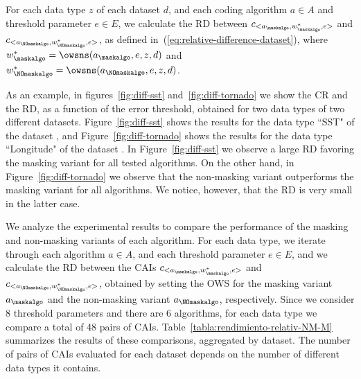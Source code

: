 For each data type $z$ of each dataset $d$, and each coding algorithm $a \in A$ and threshold parameter $e \in E$, we calculate the RD between $c_{<a_\maskalgo, w_\maskalgo^{*}, e>}$ and $c_{<a_\NOmaskalgo, w_\NOmaskalgo^{*}, e>}$, as defined in~(\ref{eq:relative-difference-dataset}), where $w_\maskalgo^{*}=\owsns(a_\maskalgo, e, z, d)$ and $w_\NOmaskalgo^{*}=\owsns(a_\NOmaskalgo, e, z, d)$.


\vspace{+2pt}
As an example, in figures~\ref{fig:diff-sst} and~\ref{fig:diff-tornado} we show the CR and the RD, as a function of the error threshold, obtained for two data types of two different datasets. Figure~\ref{fig:diff-sst} shows the results for the data type ``SST" of the dataset \datasetsst, and Figure~\ref{fig:diff-tornado} shows the results for the data type ``Longitude" of the dataset \datasettornado. In Figure~\ref{fig:diff-sst} we observe a large RD favoring the masking variant for all tested algorithms. On the other hand, in Figure~\ref{fig:diff-tornado} we observe that the non-masking variant outperforms the masking variant for all algorithms. We notice, however, that the RD is very small in the latter case.


\clearpage



\clearpage


We analyze the experimental results to compare the performance of the masking and non-masking variants of each algorithm. For each data type, we iterate through each algorithm $a \in A$, and each threshold parameter $e \in E$, and we calculate the RD between the CAIs $c_{<a_\maskalgo, w_\maskalgo^{*}, e>}$ and $c_{<a_\NOmaskalgo, w_\NOmaskalgo^{*}, e>}$, obtained by setting the OWS for the masking variant $a_\maskalgo$ and the non-masking variant $a_\NOmaskalgo$, respectively. Since we consider 8 threshold parameters and there are 6 algorithms, for each data type we compare a total of 48 pairs of CAIs. Table~\ref{tabla:rendimiento-relativ-NM-M} summarizes the results of these comparisons, aggregated by dataset. The number of pairs of CAIs evaluated for each dataset depends on the number of different data types it contains.


\vspace{+5pt}

\vspace{-5pt}


